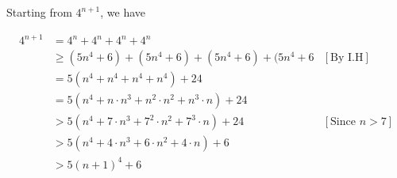 \documentclass[12pt]{article}
\begin{document}
\begin{itemize}
\begin{mdframed}
\begin{enumerate}[1.]
\begin{mdframed}
            \bigskip

            Starting from $4^{n+1}$, we have

            \begin{align}
                4^{n+1} &= 4^n + 4^n + 4^n + 4^n\\
                &\geq (5n^4 + 6) + (5n^4 + 6) + (5n^4 + 6) + (5n^4 + 6 & [\text{By I.H}]\\
                &= 5(n^4 + n^4 + n^4 + n^4) + 24\\
                &= 5(n^4 + n \cdot n^3 + n^2 \cdot n^2 + n^3 \cdot n) + 24\\
                &> 5(n^4 + 7 \cdot n^3 + 7^2 \cdot n^2 + 7^3 \cdot n) + 24 & [\text{Since $n > 7$}]\\
                &> 5(n^4 + 4 \cdot n^3 + 6 \cdot n^2 + 4 \cdot n) + 6\\
                &> 5(n+1)^4 + 6
            \end{align}

            \end{mdframed}
        \end{enumerate}

    \end{mdframed}

\end{itemize}
\end{document}
